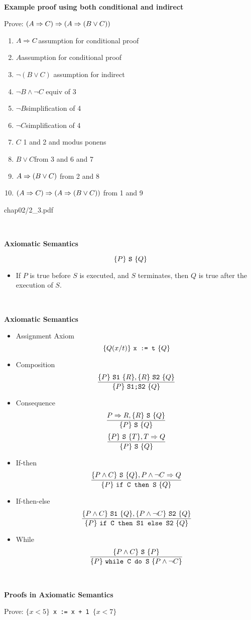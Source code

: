\documentclass{article}
\newcommand{\myfig}[1]{\begin{overpic}[scale=1.5]{#1}}
\newcommand{\myfigend}{\end{overpic}\newpage}
\newcommand{\bi}{\begin{itemize}}
\newcommand{\ii}{\item}
\newcommand{\ei}{\end{itemize}}
\newcommand{\ti}[1]{
\mbox{~}

\vspace{1.25in}
\centerline{\bf #1}}
\begin{document}
\newpage
\ti{Example proof using both conditional and indirect}
Prove: $(A\Rightarrow C) \Rightarrow (A\Rightarrow (B\lor C))$
\begin{enumerate}
\item \ind $A\Rightarrow C$\hfill assumption for conditional proof
\item \ind\ind $A$\hfill assumption for conditional proof
\item \ind\ind\ind $\neg(B\lor C)$ \hfill assumption for indirect
\item \ind\ind\ind $\neg B\land \neg C$ \hfill equiv of 3
\item \ind\ind\ind $\neg B$\hfill simplification of 4
\item \ind\ind\ind $\neg C$\hfill simplification of 4
\item \ind\ind\ind $C$ \hfill 1 and 2 and modus ponens
\item \ind\ind $B\lor C$\hfill from 3 and 6 and 7
\item \ind $A\Rightarrow (B\lor C)$ \hfill from 2 and 8
\item $(A\Rightarrow C) \Rightarrow (A\Rightarrow (B\lor C))$ \hfill from 1 and 9
\end{enumerate}

\newpage
\myfig{chap02/2_3.pdf}
\myfigend
\newcommand{\stm}[3]{\ensuremath{\{#1\}}\ \mbox{\tt #2}\ \ensuremath{\{#3\}}}

\ti{Axiomatic Semantics}
\[
\stm{P}{S}{Q}
\]
\bi
\ii If $P$ is true before $S$ is executed, and $S$ terminates, then
$Q$ is true after the execution of $S$.
\ei

\newpage
\ti{Axiomatic Semantics}
\begin{multicols}{2}
\bi
\ii Assignment Axiom
\[
\stm{Q(x/t)}{x := t}{Q}
\]

\ii Composition
\[
\frac{\stm{P}{S1}{R}, \stm{R}{S2}{Q}}{\stm{P}{S1;S2}{Q}}
\]

\ii Consequence
\[
\frac{P\imp R, \stm{R}{S}{Q}}{\stm{P}{S}{Q}}
\]
\[
\frac{\stm{P}{S}{T}, T\imp Q}{\stm{P}{S}{Q}}
\]
\ei
\end{multicols}

\bi
\ii If-then
\[
\frac{\stm{P\land C}{S}{Q}, P\land\neg C\imp Q}{\stm{P}{if C then
    S}{Q}}
\]
\ii If-then-else
\[
\frac{\stm{P\land C}{S1}{Q}, \stm{P\land\neg C}{S2}{Q}}{\stm{P}{if C then
    S1 else S2}{Q}}
\]

\ii While
\[
\frac{\stm{P\land C}{S}{P}}{\stm{P}{while C do S}{P\land\neg C}}
\]

\ei

\newpage
\ti{Proofs in Axiomatic Semantics}
Prove: \stm{x<5}{x := x + 1}{x < 7}
\end{document}
